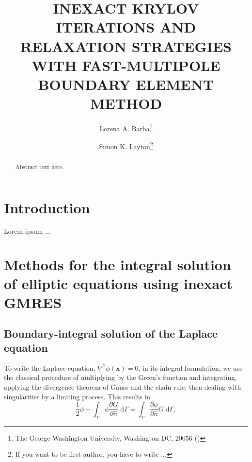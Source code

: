 \documentclass[final,leqno,]{siamltex1213}
\title{INEXACT KRYLOV ITERATIONS AND RELAXATION STRATEGIES WITH FAST-MULTIPOLE BOUNDARY ELEMENT METHOD}
\author{Lorena A. Barba\thanks{The George Washington University, Washington DC, 20056 
(\email{labarba@gwu.edu})}
\and Simon K. Layton\thanks{If you want to be first author, you have to write ...}}
\newcommand{\di}[1]{\text{d}#1}
\newcommand{\partiald}[2]{\frac{\partial #1}{\partial #2}}
\newcommand{\nhat}{\hat{n}}
\newcommand{\vect}[1]{\mathbf{#1}}
\begin{document}
\maketitle

\begin{abstract}
Abstract text here.
\end{abstract}

\begin{keywords}\end{keywords}

\begin{AMS}\end{AMS}


\pagestyle{myheadings}
\thispagestyle{plain}

\section{Introduction}

Lorem ipsum ...


\section{Methods for the integral solution of elliptic equations using inexact {\small GMRES}}

\subsection{Boundary-integral solution of the Laplace equation}

To write the Laplace equation, $\nabla^{2}\phi(\vect{x}) = 0$,  in its integral formulation, we use the classical procedure of multiplying by the Green's function and integrating, applying the divergence theorem of Gauss and the chain rule, then dealing with singularities by a limiting process. This results in
%
\begin{equation}\label{eqn:laplace_bem_final}
	\frac{1}{2}\phi + \int_{\Gamma} \phi\partiald{G}{\nhat}\;\di{\Gamma} = \int_{\Gamma}\partiald{\phi}{\nhat}G\;\di{\Gamma},
\end{equation}
\end{document}
